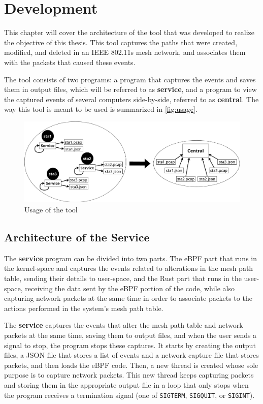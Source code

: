 \chapter{Development}\label{chap:devel}

This chapter will cover the architecture of the tool that was developed to
realize the objective of this thesis. This tool captures the paths that were
created, modified, and deleted in an \ac{IEEE} 802.11s mesh network, and
associates them with the packets that caused these events.

The tool consists of two programs: a program that captures the events and saves
them in output files, which will be referred to as \textbf{service}, and a
program to view the captured events of several computers side-by-side, referred
to as \textbf{central}. The way this tool is meant to be used is summarized in
\autoref{fig:usage}.

\begin{figure}[htb]
   \centering
   \includegraphics[scale=.225]{usage}
   \caption{Usage of the tool}\label{fig:usage}
\end{figure}


\section{Architecture of the Service}\label{sect:archser}

The \textbf{service} program can be divided into two parts. The eBPF part that
runs in the kernel-space and captures the events related to alterations in the
mesh path table, sending their details to user-space, and the Rust part that
runs in the user-space, receiving the data sent by the eBPF portion of the code,
while also capturing network packets at the same time in order to associate
packets to the actions performed in the system's mesh path table.

The \textbf{service} captures the events that alter the mesh path table and
network packets at the same time, saving them to output files, and when the user
sends a signal to stop, the program stops these captures. It starts by creating
the output files, a JSON file that stores a list of events and a network capture
file that stores packets, and then loads the eBPF code. Then, a new thread is
created whose sole purpose is to capture network packets. This new thread keeps
capturing packets and storing them in the appropriate output file in a loop that
only stops when the program receives a termination signal (one of
\texttt{SIGTERM}, \texttt{SIGQUIT}, or \texttt{SIGINT}).

